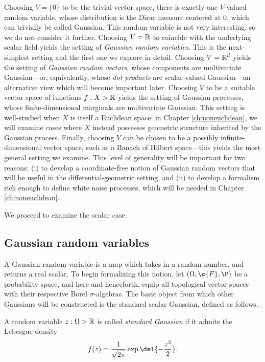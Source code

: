 \documentclass[11pt]{book}
\begin{document}
\1  Choosing $V = \{0\}$ to be the trivial vector space, there is exactly one $V$-valued random variable, whose distribution is the Dirac measure centered at $0$, which can trivially be called Gaussian.
This random variable is not very interesting, so we do not consider it further.
\2 Choosing $V = \mathbb{R}$ to coincide with the underlying scalar field yields the setting of \emph{Gaussian random variables}.
This is the next-simplest setting and the first one we explore in detail.
\3 Choosing $V = \mathbb{R}^d$ yields the setting of \emph{Gaussian random vectors}, whose components are multivariate Gaussian---or, equivalently, whose \emph{dot products} are scalar-valued Gaussian---an alternative view which will become important later.
\4 Choosing $V$ to be a suitable vector space of functions $f : X \-> \mathbb{R}$ yields the setting of Gaussian processes, whose finite-dimensional marginals are multivariate Gaussian.
This setting is well-studied when $X$ is itself a Euclidean space: in Chapter \ref{ch:noneuclidean}, we will examine cases where $X$ instead possesses geometric structure inherited by the Gaussian process.
\5 Finally, choosing $V$ can be chosen to be a possibly infinite-dimensional vector space, such as a Banach of Hilbert space---this yields the most general setting we examine.
This level of generality will be important for two reasons: (i) to develop a coordinate-free notion of Gaussian random vectors that will be useful in the differential-geometric setting, and (ii) to develop a formalism rich enough to define white noise processes, which will be needed in Chapter \ref{ch:noneuclidean}.
\0 

We proceed to examine the scalar case.

\subsection{Gaussian random variables}

A Gaussian random variable is a map which takes in a random number, and returns a real scalar.
To begin formalizing this notion, let $(\Omega,\c{F},\P)$ be a probability space, and here and henceforth, equip all topological vector spaces with their respective Borel $\sigma$-algebras. 
The basic object from which other Gaussians will be constructed is the standard scalar Gaussian, defined as follows.

\begin{definition}
A random variable $z : \Omega\->\mathbb{R}$ is called \emph{standard Gaussian} if it admits the Lebesgue density
\[
f(z) = \frac{1}{\sqrt{2\pi}} \exp\del{-\frac{z^2}{2}}
.
\]
\end{definition}
\end{document}
